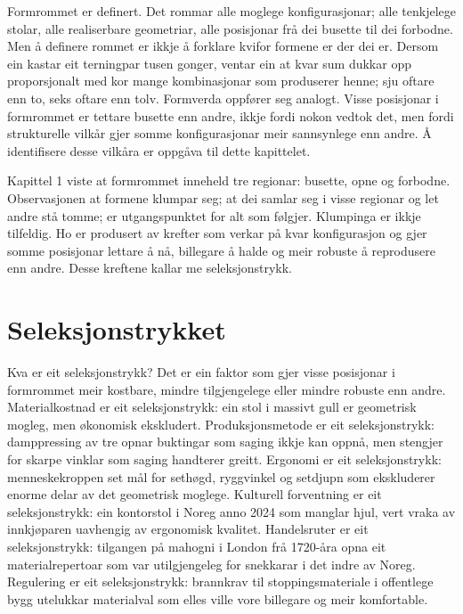 

Formrommet er definert. Det rommar alle moglege konfigurasjonar; alle tenkjelege stolar, alle realiserbare geometriar, alle posisjonar frå dei busette til dei forbodne. Men å definere rommet er ikkje å forklare kvifor formene er der dei er. Dersom ein kastar eit terningpar tusen gonger, ventar ein at kvar sum dukkar opp proporsjonalt med kor mange kombinasjonar som produserer henne; sju oftare enn to, seks oftare enn tolv. Formverda oppfører seg analogt. Visse posisjonar i formrommet er tettare busette enn andre, ikkje fordi nokon vedtok det, men fordi strukturelle vilkår gjer somme konfigurasjonar meir sannsynlege enn andre. Å identifisere desse vilkåra er oppgåva til dette kapittelet.

Kapittel 1 viste at formrommet inneheld tre regionar: busette, opne og forbodne. Observasjonen at formene klumpar seg; at dei samlar seg i visse regionar og let andre stå tomme; er utgangspunktet for alt som følgjer. Klumpinga er ikkje tilfeldig. Ho er produsert av krefter som verkar på kvar konfigurasjon og gjer somme posisjonar lettare å nå, billegare å halde og meir robuste å reprodusere enn andre. Desse kreftene kallar me seleksjonstrykk.

\section*{Seleksjonstrykket}


Kva er eit seleksjonstrykk? Det er ein faktor som gjer visse posisjonar i formrommet meir kostbare, mindre tilgjengelege eller mindre robuste enn andre. Materialkostnad er eit seleksjonstrykk: ein stol i massivt gull er geometrisk mogleg, men økonomisk ekskludert. Produksjonsmetode er eit seleksjonstrykk: damppressing av tre opnar buktingar som saging ikkje kan oppnå, men stengjer for skarpe vinklar som saging handterer greitt. Ergonomi er eit seleksjonstrykk: menneskekroppen set mål for sethøgd, ryggvinkel og setdjupn som ekskluderer enorme delar av det geometrisk moglege. Kulturell forventning er eit seleksjonstrykk: ein kontorstol i Noreg anno 2024 som manglar hjul, vert vraka av innkjøparen uavhengig av ergonomisk kvalitet. Handelsruter er eit seleksjonstrykk: tilgangen på mahogni i London frå 1720-åra opna eit materialrepertoar som var utilgjengeleg for snekkarar i det indre av Noreg. Regulering er eit seleksjonstrykk: brannkrav til stoppingsmateriale i offentlege bygg utelukkar materialval som elles ville vore billegare og meir komfortable.

